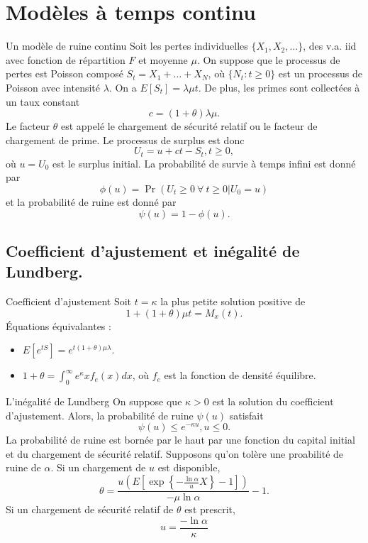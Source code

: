 \section{Modèles à temps continu}

\begin{definition}{Un modèle de ruine continu}{}
	Soit les pertes individuelles $\{X_1, X_2, \dots\}$, des v.a. iid avec fonction de répartition $F$ et moyenne $\mu$. On suppose que le processus de pertes est Poisson composé $S_t = X_1 + \dots + X_N$, où $\{N_t : t \geq 0\}$ est un processus de Poisson avec intensité $\lambda$. On a $E[S_t] = \lambda \mu t$. De plus, les primes sont collectées à un taux constant
	$$c = (1 + \theta)\lambda \mu.$$
	Le facteur $\theta$ est appelé le chargement de sécurité relatif ou le facteur de chargement de prime. Le processus de surplus est donc
	$$U_t = u + ct - S_t, t\geq 0,$$
	où $u = U_0$ est le surplus initial. 
	La probabilité de survie à temps infini est donné par 
	$$\phi(u) = \Pr(U_t \geq 0 ~\forall~ t \geq 0 \vert U_0 = u)$$
	et la probabilité de ruine est donné par $$\psi(u) = 1 - \phi(u).$$
\end{definition}

\subsection{Coefficient d'ajustement et inégalité de Lundberg.}

\begin{definition}{Coefficient d'ajustement}{}
	Soit $t = \kappa$ la plus petite solution positive de 
	$$1 + (1 + \theta)\mu t = M_x(t).$$
	Équations équivalantes : 
	\begin{itemize}
		\item $\displaystyle E\left[e^{tS}\right] = e^{t(1 + \theta)\mu \lambda}.$
		\item $\displaystyle 1 + \theta = \int_{0}^{\infty} e^\kappa x f_{e}(x)dx$, où $f_e$ est la fonction de densité équilibre. 
	\end{itemize}
\end{definition}

\begin{proposition}{L'inégalité de Lundberg}{}
	On suppose que $\kappa > 0$ est la solution du coefficient d'ajustement. Alors, la probabilité de ruine $\psi(u)$ satisfait
	$$\psi(u) \leq e^{-\kappa u}, u \leq 0.$$
	\tcblower
	La probabilité de ruine est bornée par le haut par une fonction du capital initial et du chargement de sécurité relatif. Supposons qu'on tolère une proabilité de ruine de $\alpha$. Si un chargement de $u$ est disponible, 
	$$\theta = \frac{u \left( E \left[\exp\left\{-\frac{\ln \alpha}{u} X\right\} - 1\right]\right)}{-\mu \ln \alpha} - 1.$$
	Si un chargement de sécurité relatif de $\theta$ est prescrit, $$u = \frac{-\ln \alpha}{\kappa}$$
\end{proposition}

